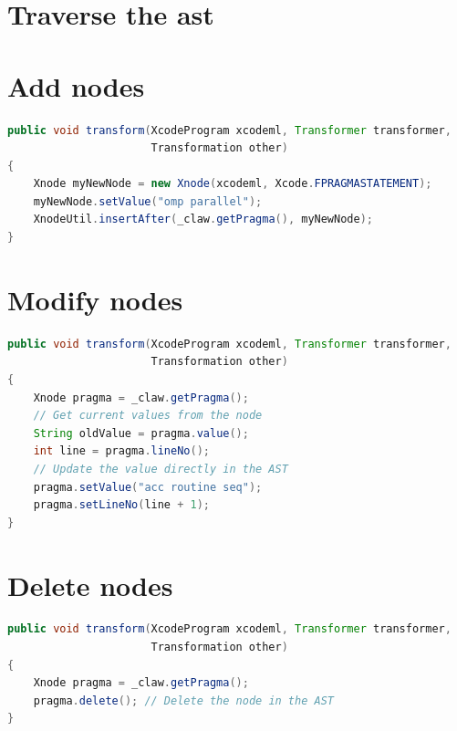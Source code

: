 \documentclass[a4paper, 11pt]{report}
\newcommand{\emptypage}{}
\begin{document}
\section{Traverse the \gls{ast}}

\section{Add nodes}

\begin{lstlisting}[label=lst:add_node, language=Java, caption=XcodeML/F add node example]
public void transform(XcodeProgram xcodeml, Transformer transformer,
                      Transformation other)
{                      
    Xnode myNewNode = new Xnode(xcodeml, Xcode.FPRAGMASTATEMENT);
    myNewNode.setValue("omp parallel");
    XnodeUtil.insertAfter(_claw.getPragma(), myNewNode);
}
\end{lstlisting}

\section{Modify nodes}

\begin{lstlisting}[label=lst:update_node, language=Java, caption=XcodeML/F update node example]
public void transform(XcodeProgram xcodeml, Transformer transformer,
                      Transformation other)
{                      
    Xnode pragma = _claw.getPragma();
    // Get current values from the node
    String oldValue = pragma.value();
    int line = pragma.lineNo();
    // Update the value directly in the AST
    pragma.setValue("acc routine seq");
    pragma.setLineNo(line + 1);
}
\end{lstlisting}

\section{Delete nodes}
\begin{lstlisting}[label=lst:delete_node, language=Java, caption=XcodeML/F delete node example]
public void transform(XcodeProgram xcodeml, Transformer transformer,
                      Transformation other)
{                      
    Xnode pragma = _claw.getPragma();
    pragma.delete(); // Delete the node in the AST
}
\end{lstlisting}


\pagebreak
\glsaddall
\printglossaries

\emptypage
\pagebreak
\listoffigures

\pagebreak
\listoftables

\emptypage
\pagebreak
\lstlistoflistings

 



%
\end{document}
